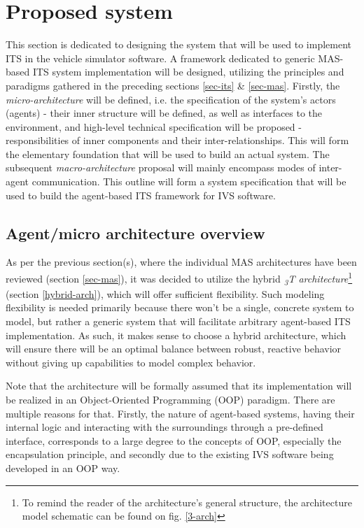 \documentclass[0main.tex]{subfiles}
\begin{document}
    
\section{Proposed system}\label{sec-system}

This section is dedicated to designing the system that will be used to implement ITS in the
vehicle simulator software. A framework dedicated to generic MAS-based ITS system
implementation will be designed, utilizing the principles and paradigms gathered in the
preceding sections \ref{sec-its} \& \ref{sec-mas}. Firstly, the \emph{micro-architecture} will be
defined, i.e. the specification of the system's actors (agents) - their inner structure 
will be defined, as well as interfaces to the environment, and high-level technical specification 
will be proposed - responsibilities of inner components and their inter-relationships.
This will form the elementary foundation that will be used to build an actual system.
The subsequent \emph{macro-architecture} proposal will mainly encompass modes of inter-
agent communication. This outline will form a system specification that will be used 
to build the agent-based ITS framework for IVS software.

\subsection{Agent/micro architecture overview}

As per the previous section(s), where the individual MAS architectures have been reviewed
(section \ref{sec-mas}), it was decided to utilize the hybrid \emph{\textsubscript{3}T
architecture}\footnote{To remind the reader of the architecture's general structure, the
architecture model schematic can be found on fig. \ref{3-arch} } (section \ref{hybrid-arch}),
which will offer sufficient flexibility.  Such modeling flexibility is needed primarily because
there won't be a single, concrete system to model, but rather a generic system that will
facilitate arbitrary agent-based ITS implementation. As such, it makes sense to choose a hybrid
architecture, which will ensure there will be an optimal balance between robust, reactive
behavior without giving up capabilities to model complex behavior.

Note that the architecture will be formally assumed that its implementation will be realized 
in an Object-Oriented Programming (OOP) paradigm. There are multiple reasons for that. Firstly, 
the nature of agent-based systems, having their internal logic and interacting with the surroundings 
through a pre-defined interface, corresponds to a large degree to the concepts of OOP, especially
the encapsulation principle, and secondly due to the existing IVS software being developed in 
an OOP way.
\end{document}
